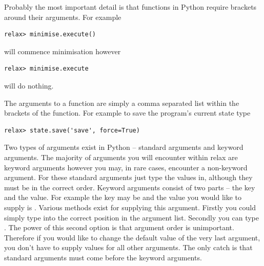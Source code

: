 Probably the most important detail is that functions in Python require brackets around their arguments.
For example

\begin{lstlisting}[numbers=none]
relax> minimise.execute()
\end{lstlisting}

will commence minimisation however

\begin{lstlisting}[numbers=none]
relax> minimise.execute
\end{lstlisting}

will do nothing.

The arguments to a function are simply a comma separated list within the brackets of the function.
For example to save the program's current state type

\begin{lstlisting}[numbers=none]
relax> state.save('save', force=True)
\end{lstlisting}

Two types of arguments exist in Python -- standard arguments and keyword arguments.
The majority of arguments you will encounter within relax are keyword arguments however you may, in rare cases, encounter a non-keyword argument.
For these standard arguments just type the values in, although they must be in the correct order.
Keyword arguments consist of two parts -- the key and the value.
For example the key may be  and the value you would like to supply is .
Various methods exist for supplying this argument.
Firstly you could simply type  into the correct position in the argument list.
Secondly you can type .
The power of this second option is that argument order is unimportant.
Therefore if you would like to change the default value of the very last argument, you don't have to supply values for all other arguments.
The only catch is that standard arguments must come before the keyword arguments.


